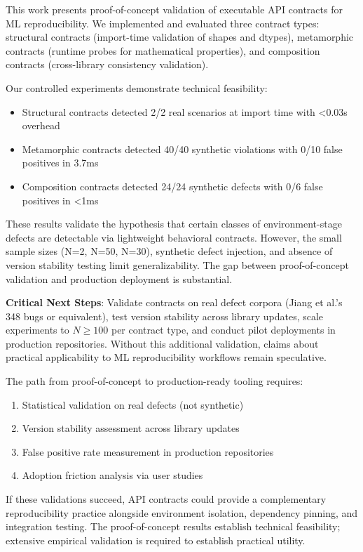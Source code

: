 
This work presents proof-of-concept validation of executable API contracts for ML reproducibility. We implemented and evaluated three contract types: structural contracts (import-time validation of shapes and dtypes), metamorphic contracts (runtime probes for mathematical properties), and composition contracts (cross-library consistency validation).

Our controlled experiments demonstrate technical feasibility:
\begin{itemize}
\item Structural contracts detected 2/2 real scenarios at import time with <0.03s overhead
\item Metamorphic contracts detected 40/40 synthetic violations with 0/10 false positives in 3.7ms
\item Composition contracts detected 24/24 synthetic defects with 0/6 false positives in <1ms
\end{itemize}

These results validate the hypothesis that certain classes of environment-stage defects are detectable via lightweight behavioral contracts. However, the small sample sizes (N=2, N=50, N=30), synthetic defect injection, and absence of version stability testing limit generalizability. The gap between proof-of-concept validation and production deployment is substantial.

\textbf{Critical Next Steps}: Validate contracts on real defect corpora (Jiang et al.'s 348 bugs or equivalent), test version stability across library updates, scale experiments to $N\geq 100$ per contract type, and conduct pilot deployments in production repositories. Without this additional validation, claims about practical applicability to ML reproducibility workflows remain speculative.

The path from proof-of-concept to production-ready tooling requires:
\begin{enumerate}
\item Statistical validation on real defects (not synthetic)
\item Version stability assessment across library updates
\item False positive rate measurement in production repositories
\item Adoption friction analysis via user studies
\end{enumerate}

If these validations succeed, API contracts could provide a complementary reproducibility practice alongside environment isolation, dependency pinning, and integration testing. The proof-of-concept results establish technical feasibility; extensive empirical validation is required to establish practical utility.
